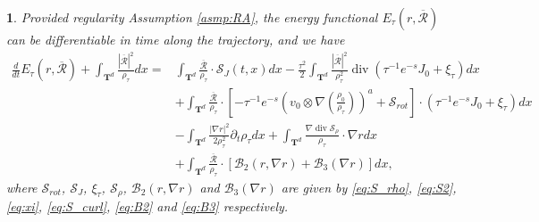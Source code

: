 \documentclass[10pt,a4paper]{amsart}
\newtheorem{prop}{}
\def\T{{\mathbf T}}%
\def\d{{\partial}}
\DeclareMathOperator{\diver}{div}
\begin{document}
\begin{prop}
Provided regularity Assumption \ref{asmp:RA}, the energy functional $E_\tau(r,\overline{\mathcal{R}})$ can be differentiable in time along the trajectory, and we have 
\begin{equation}\label{eq:dtEr}
\begin{aligned}
\frac{d}{dt}E_\tau(r,\overline{\mathcal{R}})+\int_{{\T^d}} \frac{|\overline{\mathcal{R}}|^2}{\rho_\tau}dx=&\int_{{\T^d}} \frac{\overline{\mathcal{R}}}{\rho_\tau}\cdot\mathcal{S}_J(t,x)dx-\frac{\tau^2}{2}\int_{\T^d}\frac{|\overline{\mathcal{R}}|^2}{\rho_\tau^2}\diver(\tau^{-1}e^{-s}J_0+\xi_\tau)dx\\
&+\int_{\T^d}\frac{\overline{\mathcal{R}}}{\rho_\tau}\cdot\left[-\tau^{-1} e^{-s}\left(v_0\otimes\nabla\left(\frac{\rho_0}{\rho_\tau}\right)\right)^a+\mathcal{S}_{rot}\right]\cdot(\tau^{-1}e^{-s}J_0+\xi_\tau)dx\\
&-\int_{\T^d}\frac{|\nabla r|^2}{2\rho_\tau^2}\d_t\rho_\tau dx+\int_{\T^d} \frac{\nabla\diver \mathcal{S}_\rho}{\rho_\tau}\cdot\nabla rdx\\
&+\int_{\T^d}\frac{\overline{\mathcal{R}}}{\rho_\tau}\cdot[\mathcal{B}_2(r,\nabla r)+\mathcal{B}_3(\nabla r)]dx,
\end{aligned}
\end{equation}
where $\mathcal{S}_{rot}$, $\mathcal{S}_J$, $\xi_\tau$, $\mathcal{S}_\rho$, $\mathcal{B}_2(r,\nabla r)$ and $\mathcal{B}_3(\nabla r)$ are given by \eqref{eq:S_rho}, \eqref{eq:S2}, \eqref{eq:xi}, \eqref{eq:S_curl}, \eqref{eq:B2} and \eqref{eq:B3} respectively.
\end{prop}
\end{document}
